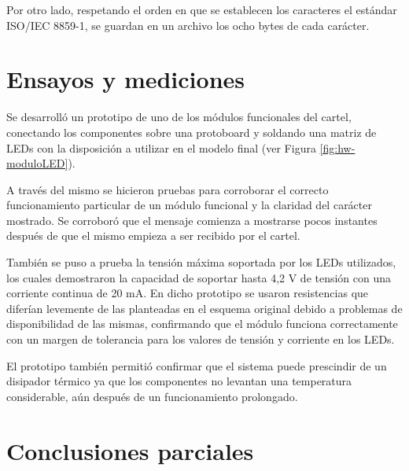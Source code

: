 Por otro lado, respetando el orden en que se establecen los caracteres el estándar ISO/IEC 8859-1, se guardan en un archivo los ocho bytes de cada carácter.

\section{Ensayos y mediciones}
Se desarrolló un prototipo de uno de los módulos funcionales del cartel, conectando los componentes sobre una protoboard y soldando una matriz de LEDs con la disposición a utilizar en el modelo final (ver Figura \ref{fig:hw-moduloLED}).

A través del mismo se hicieron pruebas para corroborar el correcto funcionamiento particular de un módulo funcional y la claridad del carácter mostrado. Se corroboró que el mensaje comienza a mostrarse pocos instantes después de que el mismo empieza a ser recibido por el cartel.

También se puso a prueba la tensión máxima soportada por los LEDs utilizados, los cuales demostraron la capacidad de soportar hasta 4,2 V de tensión con una corriente continua de 20 mA. En dicho prototipo se usaron resistencias que diferían levemente de las planteadas en el esquema original debido a problemas de disponibilidad de las mismas, confirmando que el módulo funciona correctamente con un margen de tolerancia para los valores de tensión y corriente en los LEDs.

El prototipo también permitió confirmar que el sistema puede prescindir de un disipador térmico ya que los componentes no levantan una temperatura considerable, aún después de un funcionamiento prolongado.


\section{Conclusiones parciales}

